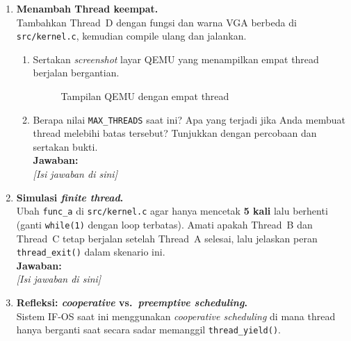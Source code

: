 \begin{enumerate}

    \item \textbf{Menambah Thread keempat.}\\
    Tambahkan Thread~D dengan fungsi dan warna VGA berbeda di
    \texttt{src/kernel.c}, kemudian compile ulang dan jalankan.

    \begin{enumerate}
        \item[(a)] Sertakan \textit{screenshot} layar QEMU yang
                   menampilkan empat thread berjalan bergantian.

        \begin{figure}[H]
            \centering
            \caption{Tampilan QEMU dengan empat thread}
        \end{figure}

        \item[(b)] Berapa nilai \texttt{MAX\_THREADS} saat ini?
                   Apa yang terjadi jika Anda membuat thread melebihi
                   batas tersebut? Tunjukkan dengan percobaan dan
                   sertakan bukti.\\[0.3cm]
                   \textbf{Jawaban:}\\
                   \textit{[Isi jawaban di sini]}
    \end{enumerate}

    \item \textbf{Simulasi \textit{finite thread}.}\\
    Ubah \texttt{func\_a} di \texttt{src/kernel.c} agar hanya
    mencetak \textbf{5 kali} lalu berhenti (ganti \texttt{while(1)}
    dengan loop terbatas). Amati apakah Thread~B dan Thread~C tetap
    berjalan setelah Thread~A selesai, lalu jelaskan peran
    \texttt{thread\_exit()} dalam skenario ini.\\[0.3cm]
    \textbf{Jawaban:}\\
    \textit{[Isi jawaban di sini]}

    \item \textbf{Refleksi: \textit{cooperative} vs.\
    \textit{preemptive scheduling}.}\\
    Sistem IF-OS saat ini menggunakan \textit{cooperative scheduling}
    di mana thread hanya berganti saat secara sadar memanggil
    \texttt{thread\_yield()}.


\end{enumerate}
